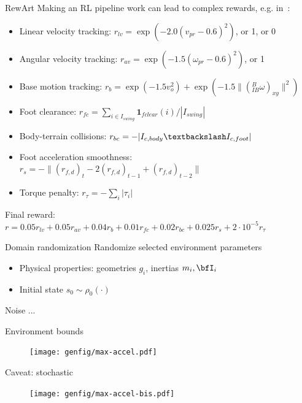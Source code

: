 \documentclass[11pt, aspectratio=169]{beamer}
\begin{document}
\begin{frame}{RewArt}
    Making an RL pipeline work can lead to complex rewards, e.g. in~\cite{lee2020}:
    \begin{itemize}
        \item Linear velocity tracking: $r_{lv} = \exp(-2.0 (v_{pr} - 0.6)^2)$, or 1, or 0
        \item Angular velocity tracking: $r_{av} = \exp(-1.5 (\omega_{pr} - 0.6)^2)$, or 1
        \item Base motion tracking: $r_b = \exp(-1.5v_o^2) + \exp(-1.5 \|({}^B_{IB} \omega)_{xy}\|^2)$
        \item Foot clearance: $r_{fc} = \sum_{i \in I_{swing}} \mathbf{1}_{fclear}(i) / |I_{swing}|$
        \item Body-terrain collisions: $r_{bc} = -|I_{c,body} \textbackslash I_{c,foot}|$
        \item Foot acceleration smoothness: $r_{s} = -\| (r_{f,d})_t - 2(r_{f,d})_{t-1} + (r_{f,d})_{t-2}\|$
        \item Torque penalty: $r_{\tau} = -\sum_{i} | \tau_i |$
    \end{itemize}
    Final reward: $r = 0.05 r_{lv} + 0.05 r_{av} + 0.04 r_b + 0.01 r_{fc} + 0.02 r_{bc} + 0.025 r_s + 2 \cdot 10^{-5} r_{\tau}$
\end{frame}

\begin{frame}{Domain randomization}
    Randomize selected environment parameters
    \begin{itemize}
        \item Physical properties: geometries $g_i$, inertias $m_i, \bfI_i$
        \item Initial state $s_0 \sim \rho_0(\cdot)$
    \end{itemize}
\end{frame}

\begin{frame}{Noise}
    ...
\end{frame}

\begin{frame}{Environment bounds}
    \begin{figure}
        \centering
        \texttt{[image: genfig/max-accel.pdf]}
    \end{figure}
\end{frame}

\begin{frame}{Caveat: stochastic}
    \begin{figure}
        \centering
        \texttt{[image: genfig/max-accel-bis.pdf]}
    \end{figure}
\end{frame}
\end{document}

